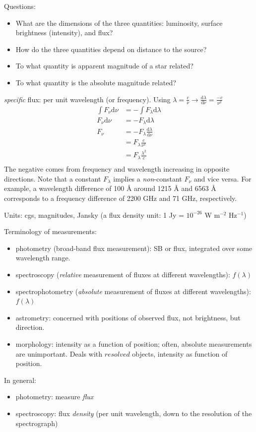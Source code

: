 \documentclass[12pt]{article}
\begin{document}
Questions:
\begin{itemize}
    \item What are the dimensions of the three quantities: luminosity,
        surface brightness (intensity), and flux?
    \item How do the three quantities depend on distance to the source?
    \item To what quantity is apparent magnitude of a star related?
    \item To what quantity is the absolute magnitude related?
\end{itemize}
\emph{specific} flux: per unit wavelength (or frequency).
Using $\lambda=\frac{c}{\nu} \rightarrow
\frac{\textrm{d}\lambda}{\textrm{d}\nu} = \frac{-c}{\nu^2}$
\begin{align*}
    \int F_{\nu} \textrm{d} \nu &= -\int F_{\lambda} \textrm{d} \lambda\\
    F_{\nu} \textrm{d} \nu &= -F_{\lambda} \textrm{d} \lambda\\
    F_{\nu} &= -F_{\lambda} \frac{\textrm{d} \lambda}{\textrm{d}\nu}\\
    &= F_{\lambda} \frac{c}{\nu^2}\\
    &= F_{\lambda} \frac{\lambda^2}{c}\\
\end{align*}
The negative comes from frequency and wavelength increasing in
opposite directions.
Note that a constant $F_{\lambda}$ implies a \emph{non}-constant $F_{\nu}$
and vice versa. For example, a wavelength difference of 100 \AA{}
around 1215 \AA{} and 6563 \AA{} corresponds to a frequency difference
of 2200 GHz and 71 GHz, respectively.

Units: cgs, magnitudes, Jansky (a flux density unit:
1 Jy = $10^{-26}$ W m$^{-2}$ Hz$^{-1}$)

Terminology of measurements:
\begin{itemize}
    \item photometry (broad-band flux measurement): SB or flux, integrated
        over some wavelength range.
    \item spectroscopy (\emph{relative} measurement of fluxes at
        different wavelengths):
        $f(\lambda)$
    \item spectrophotometry (\emph{absolute} measurement of fluxes at
        different wavelengths):
        $f(\lambda)$
    \item astrometry: concerned with positions of observed flux, not brightness,
        but direction.
    \item morphology: intensity as a function of position;
        often, absolute measurements are unimportant. Deals with $resolved$
        objects, intensity as function of position.
\end{itemize}
In general:
\begin{itemize}
    \item photometry: measure \emph{flux}
    \item spectroscopy: flux \emph{density} (per unit wavelength,
        down to the resolution of the spectrograph)
\end{itemize}
\end{document}
